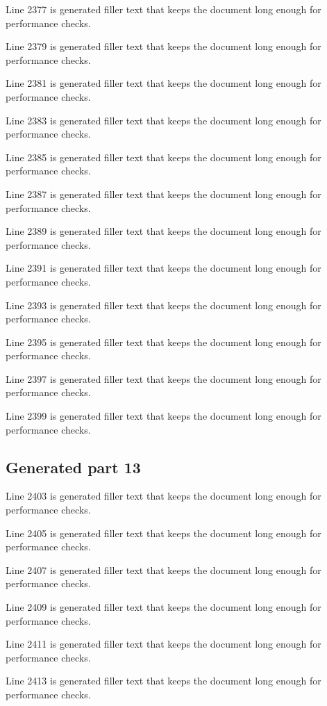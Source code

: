 Line 2377 is generated filler text that keeps the document long enough for performance checks.

Line 2379 is generated filler text that keeps the document long enough for performance checks.

Line 2381 is generated filler text that keeps the document long enough for performance checks.

Line 2383 is generated filler text that keeps the document long enough for performance checks.

Line 2385 is generated filler text that keeps the document long enough for performance checks.

Line 2387 is generated filler text that keeps the document long enough for performance checks.

Line 2389 is generated filler text that keeps the document long enough for performance checks.

Line 2391 is generated filler text that keeps the document long enough for performance checks.

Line 2393 is generated filler text that keeps the document long enough for performance checks.

Line 2395 is generated filler text that keeps the document long enough for performance checks.

Line 2397 is generated filler text that keeps the document long enough for performance checks.

Line 2399 is generated filler text that keeps the document long enough for performance checks.

\subsection{Generated part 13}

Line 2403 is generated filler text that keeps the document long enough for performance checks.

Line 2405 is generated filler text that keeps the document long enough for performance checks.

Line 2407 is generated filler text that keeps the document long enough for performance checks.

Line 2409 is generated filler text that keeps the document long enough for performance checks.

Line 2411 is generated filler text that keeps the document long enough for performance checks.

Line 2413 is generated filler text that keeps the document long enough for performance checks.

